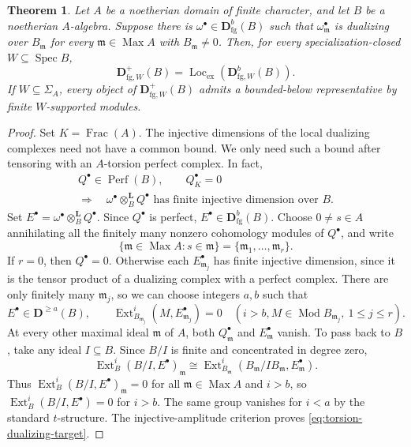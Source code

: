 \documentclass[11pt]{amsart}
\numberwithin{equation}{section}
\newtheorem{theorem}{Theorem}[section]
\theoremstyle{definition}
\theoremstyle{remark}
\DeclareMathOperator{\Spec}{Spec}
\DeclareMathOperator{\Max}{Max}
\DeclareMathOperator{\Perf}{Perf}
\DeclareMathOperator{\Loc}{Loc}
\DeclareMathOperator{\Ext}{Ext}
\DeclareMathOperator{\Frac}{Frac}
\newcommand{\D}{\mathbf D}
\newcommand{\fg}{\mathrm{fg}}
\newcommand{\Lex}{\Loc_{\mathrm{ex}}}
\newcommand{\Mod}{\operatorname{Mod}}
\newcommand{\m}{\mathfrak m}
\begin{document}
\begin{theorem}
\label{prop:dualizing-gluing}
Let $A$ be a noetherian domain of finite character, and let $B$ be a
noetherian $A$-algebra. Suppose there is $\omega^{\bullet}\in\D^b_{\fg}(B)$ such
that $\omega_\m^{\bullet}$ is dualizing over $B_\m$ for every
$\m\in\Max A$ with $B_\m\ne0$. Then, for every specialization-closed
$W\subseteq\Spec B$,
\begin{equation}\label{eq:local-duality-generation}
 \D^+_{\fg,W}(B)=\Lex(\D^b_{\fg,W}(B)).
\end{equation}
If $W\subseteq\Sigma_A$, every object of $\D^+_{\fg,W}(B)$ admits a
bounded-below representative by finite $W$-supported modules.
\end{theorem}
\begin{proof}
Set $K=\Frac(A)$. The injective dimensions of the local dualizing
complexes need not have a common bound. We only need such a bound
after tensoring with an $A$-torsion perfect complex. In fact,
\begin{equation}\label{eq:torsion-dualizing-target}
 \begin{gathered}
 Q^{\bullet}\in\Perf(B),\qquad Q_K^{\bullet}=0\\
 \Longrightarrow\quad
 \omega^{\bullet}\otimes_B^{\mathbf L}Q^{\bullet}
 \text{ has finite injective dimension over }B.
 \end{gathered}
\end{equation}
Set $E^{\bullet}=\omega^{\bullet}\otimes_B^{\mathbf L}Q^{\bullet}$.
Since $Q^{\bullet}$ is perfect, $E^{\bullet}\in\D^b_{\fg}(B)$.
Choose $0\ne s\in A$ annihilating all the finitely many nonzero
cohomology modules of $Q^{\bullet}$, and write
\[
 \{\m\in\Max A:s\in\m\}=\{\m_1,\ldots,\m_r\}.
\]
If $r=0$, then $Q^{\bullet}=0$. Otherwise each
$E^{\bullet}_{\m_j}$ has finite injective dimension, since it is
the tensor product of a dualizing complex with a perfect complex.
There are only finitely many $\m_j$, so we can choose integers
$a,b$ such that
\[
 E^{\bullet}\in\D^{\geq a}(B),\qquad
 \Ext^i_{B_{\m_j}}(M,E^{\bullet}_{\m_j})=0
 \quad(i>b, M\in\Mod B_{\m_j},\ 1\leq j\leq r).
\]
At every other maximal ideal $\m$ of $A$, both
$Q^{\bullet}_{\m}$ and $E^{\bullet}_{\m}$ vanish. To pass back
to $B$, take any ideal $I\subseteq B$. Since $B/I$ is finite and
concentrated in degree zero,
\[
 \Ext^i_B(B/I,E^{\bullet})_{\m}
 \cong
 \Ext^i_{B_{\m}}(B_{\m}/IB_{\m},E^{\bullet}_{\m}).
\]
Thus $\Ext^i_B(B/I,E^{\bullet})_{\m}=0$ for all
$\m\in\Max A$ and $i>b$, so
$\Ext^i_B(B/I,E^{\bullet})=0$ for $i>b$. The same group vanishes
for $i<a$ by the standard $t$-structure. The injective-amplitude
criterion \cite[Tag~0A5T]{Stacks} proves
\eqref{eq:torsion-dualizing-target}.


\end{proof}
\end{document}
